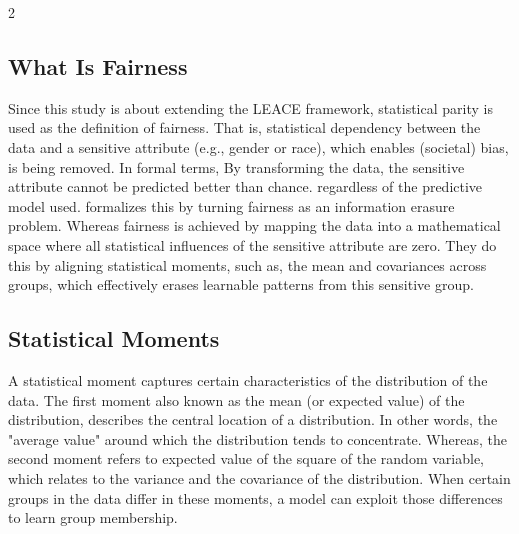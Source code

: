 \documentclass[ecta,nameyear,final]{econsocart}
\numberwithin{equation}{section}
\theoremstyle{plain}
\theoremstyle{definition}
\begin{document}
\begin{multicols}{2}
\subsection{What Is Fairness}
Since this study is about extending the LEACE framework, statistical parity is used as the definition of fairness. That is, statistical dependency between the data and a sensitive attribute (e.g., gender or race), which enables (societal) bias, is being removed. In formal terms, By transforming the data, the sensitive attribute cannot be predicted better than chance. regardless of the predictive model used.
\newline \newline
\cite{Centorrino2022} formalizes this by turning fairness as an information erasure problem. Whereas fairness is achieved by mapping the data into a mathematical space where all statistical influences of the sensitive attribute are zero. They do this by aligning statistical moments, such as, the mean and covariances across groups, which effectively erases learnable patterns from this sensitive group.

\subsection{Statistical Moments}
A statistical moment captures certain characteristics of the distribution of the data. The first moment also known as the mean (or expected value) of the distribution, describes the central location of a distribution. In other words, the "average value" around which the distribution tends to concentrate.
\newline \newline
Whereas, the second moment refers to expected value of the square of the random variable, which relates to the variance and the covariance of the distribution.
\newline \newline
When certain groups in the data differ in these moments, a model can exploit those differences to learn group membership.


\end{multicols}
\end{document}
